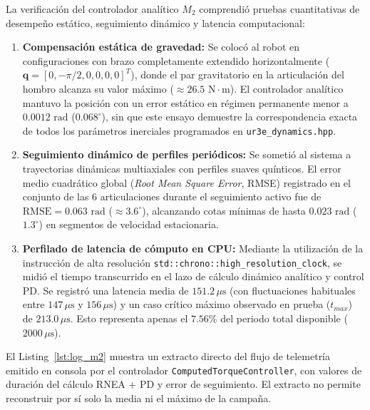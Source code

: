 \documentclass[12pt]{article}
\begin{document}
La verificación del controlador analítico $M_2$ comprendió pruebas cuantitativas de desempeño estático, seguimiento dinámico y latencia computacional:

\begin{enumerate}
    \item \textbf{Compensación estática de gravedad:} Se colocó al robot en configuraciones con brazo completamente extendido horizontalmente ($\bm{q} = [0, -\pi/2, 0, 0, 0, 0]^T$), donde el par gravitatorio en la articulación del hombro alcanza su valor máximo ($\approx 26.5\text{ N}\cdot\text{m}$). El controlador analítico mantuvo la posición con un error estático en régimen permanente menor a $0.0012\text{ rad}$ ($0.068^\circ$), sin que este ensayo demuestre la correspondencia exacta de todos los parámetros inerciales programados en \texttt{ur3e\_dynamics.hpp}.
    \item \textbf{Seguimiento dinámico de perfiles periódicos:} Se sometió al sistema a trayectorias dinámicas multiaxiales con perfiles suaves quínticos. El error medio cuadrático global (\textit{Root Mean Square Error}, RMSE) registrado en el conjunto de las 6 articulaciones durante el seguimiento activo fue de $\text{RMSE} = 0.063\text{ rad}$ ($\approx 3.6^\circ$), alcanzando cotas mínimas de hasta $0.023\text{ rad}$ ($1.3^\circ$) en segmentos de velocidad estacionaria.
    \item \textbf{Perfilado de latencia de cómputo en CPU:} Mediante la utilización de la instrucción de alta resolución \texttt{std::chrono::high\_resolution\_clock}, se midió el tiempo transcurrido en el lazo de cálculo dinámico analítico y control PD. Se registró una latencia media de $151.2\,\mu\text{s}$ (con fluctuaciones habituales entre $147\,\mu\text{s}$ y $156\,\mu\text{s}$) y un caso crítico máximo observado en prueba ($t_{max}$) de $213.0\,\mu\text{s}$. Esto representa apenas el $7.56\%$ del periodo total disponible ($2000\,\mu\text{s}$).
\end{enumerate}

El Listing~\ref{lst:log_m2} muestra un extracto directo del flujo de telemetría emitido en consola por el controlador \texttt{ComputedTorqueController}, con valores de duración del cálculo RNEA + PD y error de seguimiento. El extracto no permite reconstruir por sí solo la media ni el máximo de la campaña.
\end{document}
